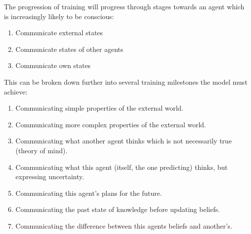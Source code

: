 \documentclass{article}
\begin{document}
The progression of training will progress through stages towards an agent which is increasingly likely to be conscious: 
\begin{enumerate}
    \item Communicate external states 
    \item Communicate states of other agents
    \item Communicate own states 
\end{enumerate}
This can be broken down further into several training milestones the model must achieve:
\begin{enumerate}
    \item  Communicating simple properties of the external world. 
    \item  Communicating more complex properties of the external world.
    \item  Communicating what another agent thinks which is not necessarily true (theory of mind).
    \item  Communicating what this agent (itself, the one predicting) thinks, but expressing uncertainty.
    \item  Communicating this agent's plans for the future.
    \item  Communicating the past state of knowledge before updating beliefs.
    \item  Communicating the difference between this agents beliefs and another's.
\end{enumerate}
\end{document}
